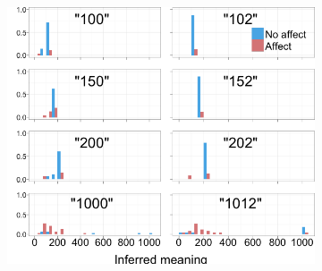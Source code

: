 \documentclass{article} %
\begin{document}
\begin{figure}[t]
\begin{subfigure}[b]{0.51\textwidth}
                \includegraphics[width=\textwidth]{humans_textbook_all.png}
	\end{subfigure}
	\qquad
	

\end{figure}
\end{document}
